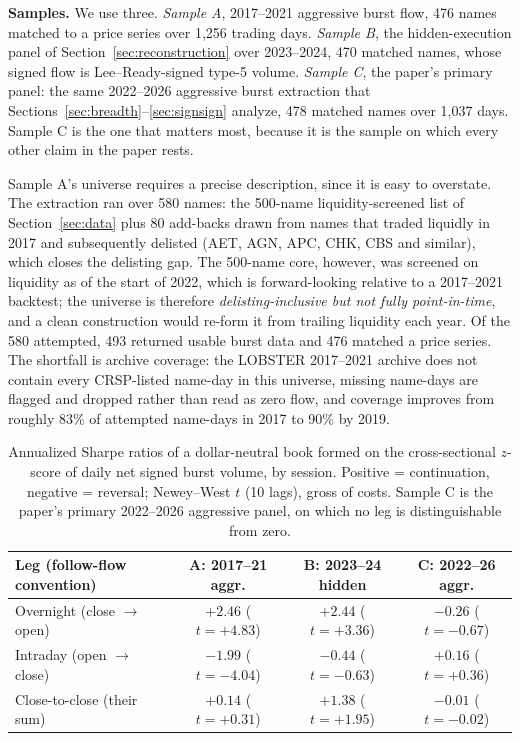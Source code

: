 \documentclass[11pt]{article}
\begin{document}
\textbf{Samples.} We use three. \emph{Sample A}, 2017--2021 aggressive burst flow, 476 names matched to a price series over 1{,}256 trading days. \emph{Sample B}, the hidden-execution panel of Section~\ref{sec:reconstruction} over 2023--2024, 470 matched names, whose signed flow is Lee--Ready-signed type-5 volume. \emph{Sample C}, the paper's primary panel: the same 2022--2026 aggressive burst extraction that Sections~\ref{sec:breadth}--\ref{sec:signsign} analyze, 478 matched names over 1{,}037 days. Sample C is the one that matters most, because it is the sample on which every other claim in the paper rests.

Sample A's universe requires a precise description, since it is easy to overstate. The extraction ran over 580 names: the 500-name liquidity-screened list of Section~\ref{sec:data} plus 80 add-backs drawn from names that traded liquidly in 2017 and subsequently delisted (AET, AGN, APC, CHK, CBS and similar), which closes the delisting gap. The 500-name core, however, was screened on liquidity as of the start of 2022, which is forward-looking relative to a 2017--2021 backtest; the universe is therefore \emph{delisting-inclusive but not fully point-in-time}, and a clean construction would re-form it from trailing liquidity each year. Of the 580 attempted, 493 returned usable burst data and 476 matched a price series. The shortfall is archive coverage: the LOBSTER 2017--2021 archive does not contain every CRSP-listed name-day in this universe, missing name-days are flagged and dropped rather than read as zero flow, and coverage improves from roughly 83\% of attempted name-days in 2017 to 90\% by 2019.

\begin{table}[htbp]
\centering
\begin{tabular}{lccc}
\toprule
\textbf{Leg (follow-flow convention)} & \textbf{A: 2017--21 aggr.} & \textbf{B: 2023--24 hidden} & \textbf{C: 2022--26 aggr.} \\
\midrule
Overnight (close $\to$ open)  & $+2.46$ ($t=+4.83$) & $+2.44$ ($t=+3.36$) & $-0.26$ ($t=-0.67$) \\
Intraday (open $\to$ close)   & $-1.99$ ($t=-4.04$) & $-0.44$ ($t=-0.63$) & $+0.16$ ($t=+0.36$) \\
Close-to-close (their sum)    & $+0.14$ ($t=+0.31$) & $+1.38$ ($t=+1.95$) & $-0.01$ ($t=-0.02$) \\
\bottomrule
\end{tabular}
\caption{Annualized Sharpe ratios of a dollar-neutral book formed on the cross-sectional $z$-score of daily net signed burst volume, by session. Positive = continuation, negative = reversal; Newey--West $t$ (10 lags), gross of costs. Sample C is the paper's primary 2022--2026 aggressive panel, on which no leg is distinguishable from zero.}
\label{tab:tugofwar}
\end{table}
\end{document}
